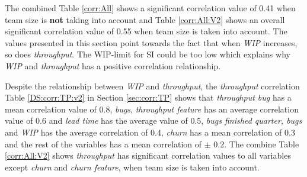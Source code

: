 \documentclass[UKenglish]{ifimaster}  %
\begin{document}
The combined Table \ref{corr:All} shows a significant correlation value of 0.41 when team size is \textbf{not} taking into account and Table \ref{corr:All:V2} shows an overall significant correlation value of 0.55 when team size is taken into account. The values presented in this section point towards the fact that when \textit{WIP} increases, so does \textit{throughput}. The WIP-limit for SI could be too low which explains why \textit{WIP} and \textit{throughput} has a positive correlation relationship.






Despite the relationship between \textit{WIP} and \textit{throughput}, the \textit{throughput} correlation Table \ref{DS:corr:TP:v2} in Section \ref{sec:corr:TP} shows that \textit{throughput bug} has a mean correlation value of 0.8, \textit{bugs}, \textit{throughput feature} has an average correlation value of 0.6 and  \textit{lead time} has the average value of 0.5, \textit{bugs finished quarter, bugs} and \textit{WIP} has the average correlation of 0.4, \textit{churn} has a mean correlation of 0.3 and the rest of the variables has a mean correlation of $\pm$ 0.2.
The combine Table \ref{corr:All:V2} shows \textit{throughput} has significant correlation values to all variables except \textit{churn} and \textit{churn feature}, when team size is taken into account.
\end{document}
